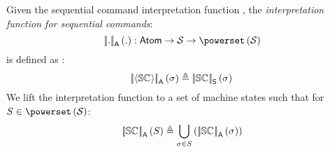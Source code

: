 %
%
\begin{definition}
Given the sequential command interpretation function , the \emph{interpretation function for sequential commands}:
%
\[
	\opSemA{.}{.} : \Atoms \rightarrow \MStates \rightarrow \pset{\MStates}
\]
%
is defined as :
%
\[
	\opSemA{\atomic{\seq{}}}{\ms{}} \eqdef  \opSemSeq{\seq{}}{\ms{}}\\
\]
%
We lift the interpretation function to a set of machine states such that for $S \in \pset{\MStates}$:
%
\[
	\opSemA{\seq{}}{S} \eqdef \bigcup\limits_{\ms{} \in S} \left( \opSemA{\seq{}}{\ms{}}\right)
\]
%
\end{definition}
%
%


